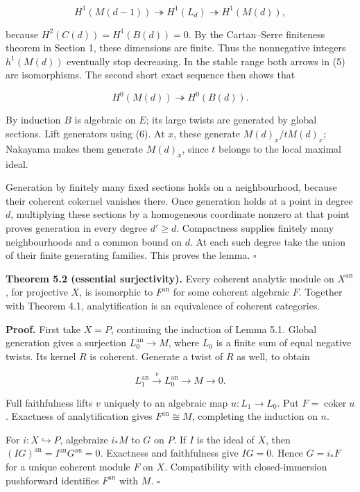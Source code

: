 \documentclass[11pt]{article}
\begin{document}
\[
H^1(M(d-1))\twoheadrightarrow H^1(L_d)
\twoheadrightarrow H^1(M(d)),
\tag{5}
\]

because \(H^2(C(d))=H^1(B(d))=0\). By the Cartan--Serre finiteness
theorem in Section 1, these dimensions are finite. Thus the nonnegative
integers \(h^1(M(d))\) eventually stop decreasing. In the stable range
both arrows in (5) are isomorphisms. The second short exact sequence
then shows that

\[
H^0(M(d))\twoheadrightarrow H^0(B(d)).
\tag{6}
\]

By induction \(B\) is algebraic on \(E\); its large twists are generated
by global sections. Lift generators using (6). At \(x\), these generate
\(M(d)_x/tM(d)_x\); Nakayama makes them generate \(M(d)_x\), since \(t\)
belongs to the local maximal ideal.

Generation by finitely many fixed sections holds on a neighbourhood,
because their coherent cokernel vanishes there. Once generation holds at
a point in degree \(d\), multiplying these sections by a homogeneous
coordinate nonzero at that point proves generation in every degree
\(d'\geq d\). Compactness supplies finitely many neighbourhoods and a
common bound on \(d\). At each such degree take the union of their
finite generating families. This proves the lemma. \(\square\)

\textbf{Theorem 5.2 (essential surjectivity).} Every coherent analytic
module on \(X^{\mathrm{an}}\), for projective \(X\), is isomorphic to
\(F^{\mathrm{an}}\) for some coherent algebraic \(F\). Together with
Theorem 4.1, analytification is an equivalence of coherent categories.

\textbf{Proof.} First take \(X=P\), continuing the induction of Lemma
5.1. Global generation gives a surjection \(L_0^{\mathrm{an}}\to M\),
where \(L_0\) is a finite sum of equal negative twists. Its kernel \(R\)
is coherent. Generate a twist of \(R\) as well, to obtain

\[
L_1^{\mathrm{an}}\xrightarrow{v}L_0^{\mathrm{an}}\to M\to0.
\]

Full faithfulness lifts \(v\) uniquely to an algebraic map
\(u:L_1\to L_0\). Put \(F=\operatorname{coker}u\). Exactness of
analytification gives \(F^{\mathrm{an}}\cong M\), completing the
induction on \(n\).

For \(i:X\hookrightarrow P\), algebraize \(i_*M\) to \(G\) on \(P\). If
\(I\) is the ideal of \(X\), then
\((IG)^{\mathrm{an}}=I^{\mathrm{an}}G^{\mathrm{an}}=0\). Exactness and
faithfulness give \(IG=0\). Hence \(G=i_*F\) for a unique coherent
module \(F\) on \(X\). Compatibility with closed-immersion pushforward
identifies \(F^{\mathrm{an}}\) with \(M\). \(\square\)
\end{document}
